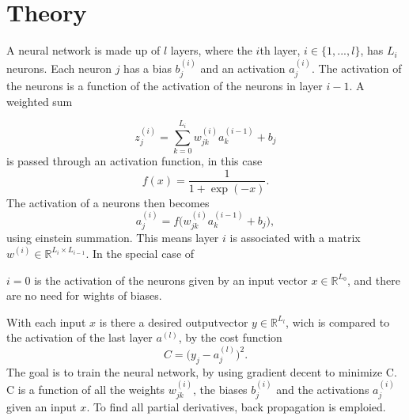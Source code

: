 \section*{Theory}
A neural network is made up of $l$ layers, where the $i$th layer, $i \in \{1, ..., l\}$, has $L_i$ neurons. 
Each neuron $j$ has a bias $b^{(i)}_j$ and an activation $a^{(i)}_j$. The activation of the neurons is a function of the activation of the neurons in layer $i - 1$. 
A weighted sum 

$$
    z^{(i)}_j = \sum_{k = 0}^{L_i} w^{(i)}_{jk} a^{(i - 1)}_k + b_j
$$
%
is passed through an activation function, in this case
%
$$
    f(x) = \frac{1}{1 + \exp(-x)}.
$$
%
The activation of a neurons then becomes
%
$$
    a^{(i)}_{j} = f\big(w^{(i)}_{jk} a^{(i - 1)}_k + b_j \big),
$$
%
using einstein summation. This means layer $i$ is associated with a matrix $w^{(i)} \in \mathbb{R}^{L_i \times L_{i-1}}$. In the special case of 

$i = 0$ is the activation of the neurons given by an input vector $x \in \mathbb{R}^{L_0}$, and there are no need for wights of biases.

With each input $x$ is there a desired outputvector $y \in \mathbb{R}^{L_{l}}$, wich is compared to the activation of the last layer $a^{(l)}$, by the cost function
%
$$
    C = \big(y_j - a^{(l)}_j\big)^2.
$$
%
The goal is to train the neural network, by using gradient decent to minimize C. C is a function of all the weights $w^{(i)}_{jk}$, the biases $b^{(i)}_j$ and the activations $a^{(i)}_j$ given an input $x$. To find all partial derivatives, back propagation is emploied.
